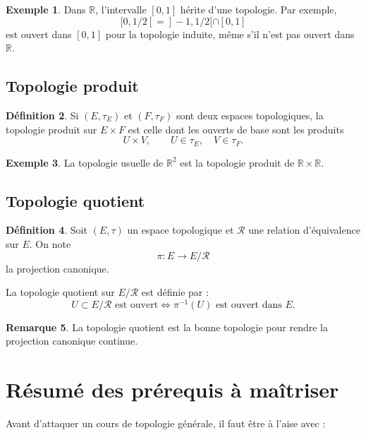 \documentclass[11pt,a4paper]{article}
\theoremstyle{definition}
\newtheorem{definition}{Définition}[section]
\newtheorem{exemple}[definition]{Exemple}
\newtheorem{remarque}[definition]{Remarque}
\theoremstyle{plain}
\newcommand{\R}{\mathbb{R}}
\begin{document}
\begin{exemple}
Dans $\R$, l'intervalle $[0,1]$ hérite d'une topologie.
Par exemple,
\[
[0,1/2[
=
]-1,1/2[\cap [0,1]
\]
est ouvert dans $[0,1]$ pour la topologie induite, même s'il n'est pas ouvert dans $\R$.
\end{exemple}

\subsection{Topologie produit}

\begin{definition}
Si $(E,\tau_E)$ et $(F,\tau_F)$ sont deux espaces topologiques, la topologie produit sur $E\times F$ est celle dont les ouverts de base sont les produits
\[
U\times V,
\qquad
U\in\tau_E,
\quad
V\in\tau_F.
\]
\end{definition}

\begin{exemple}
La topologie usuelle de $\R^2$ est la topologie produit de $\R\times\R$.
\end{exemple}

\subsection{Topologie quotient}

\begin{definition}
Soit $(E,\tau)$ un espace topologique et $\mathcal R$ une relation d'équivalence sur $E$.
On note
\[
\pi:E\to E/\mathcal R
\]
la projection canonique.

La topologie quotient sur $E/\mathcal R$ est définie par :
\[
U\subset E/\mathcal R \text{ est ouvert}
\Longleftrightarrow
\pi^{-1}(U)\text{ est ouvert dans }E.
\]
\end{definition}

\begin{remarque}
La topologie quotient est la bonne topologie pour rendre la projection canonique continue.
\end{remarque}

\section{Résumé des prérequis à maîtriser}

Avant d'attaquer un cours de topologie générale, il faut être à l'aise avec :
\end{document}
